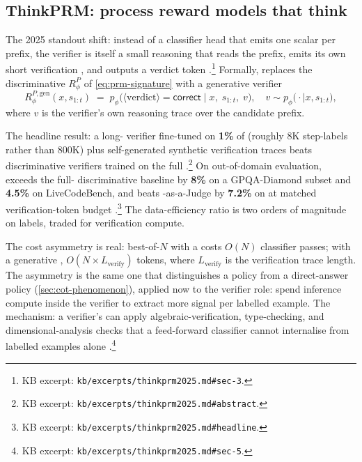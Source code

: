 \subsection{ThinkPRM: process reward models that think}
\label{sec:prm-thinkprm}

The 2025 standout shift: instead of a classifier head that emits one
scalar per prefix, the verifier is itself a small reasoning  that
reads the prefix, emits its own short verification ,
and outputs a verdict token \citep[\S 3]{thinkprm2025}.\footnote{KB
excerpt: \nolinkurl{kb/excerpts/thinkprm2025.md#sec-3}.} Formally,
 replaces the discriminative $R^P_\phi$ of \cref{eq:prm-signature}
with a generative verifier
\begin{equation}
  R^{P,\text{gen}}_\phi(x, s_{1:t}) \;=\; p_\phi\!\bigl(\langle\text{verdict}\rangle = \mathsf{correct} \;\big|\; x,\; s_{1:t},\; v\bigr), \quad v \sim p_\phi\!\bigl(\cdot \mid x, s_{1:t}\bigr),
  \label{eq:thinkprm-gen}
\end{equation}
where $v$ is the verifier's own reasoning trace over the candidate
prefix.

The headline result: a long- verifier fine-tuned on
\textbf{1\%} of  (roughly 8K step-labels rather than 800K)
plus self-generated synthetic verification traces beats discriminative
verifiers trained on the full 
\citep[abstract]{thinkprm2025}.\footnote{KB excerpt:
\nolinkurl{kb/excerpts/thinkprm2025.md#abstract}.} On out-of-domain
evaluation,  exceeds the full- discriminative baseline
by \textbf{8\%} on a GPQA-Diamond subset and \textbf{4.5\%} on
LiveCodeBench, and beats -as-a-Judge by \textbf{7.2\%} on
 at matched verification-token budget
\citep[abstract]{thinkprm2025}.\footnote{KB excerpt:
\nolinkurl{kb/excerpts/thinkprm2025.md#headline}.} The data-efficiency
ratio is two orders of magnitude on labels, traded for verification
compute.

The cost asymmetry is real: best-of-$N$ with a 
costs $O(N)$ classifier passes; with a generative ,
$O(N \times L_\text{verify})$ tokens, where $L_\text{verify}$ is the
verification trace length. The asymmetry is the same one that
distinguishes a  policy from a direct-answer policy
(\cref{sec:cot-phenomenon}), applied now to the verifier role: spend
inference compute inside the verifier to extract more signal per
labelled example. The mechanism: a verifier's  can apply
algebraic-verification, type-checking, and dimensional-analysis
checks that a feed-forward classifier cannot internalise from
labelled examples alone \citep[\S 5]{thinkprm2025}.\footnote{KB
excerpt: \nolinkurl{kb/excerpts/thinkprm2025.md#sec-5}.}

